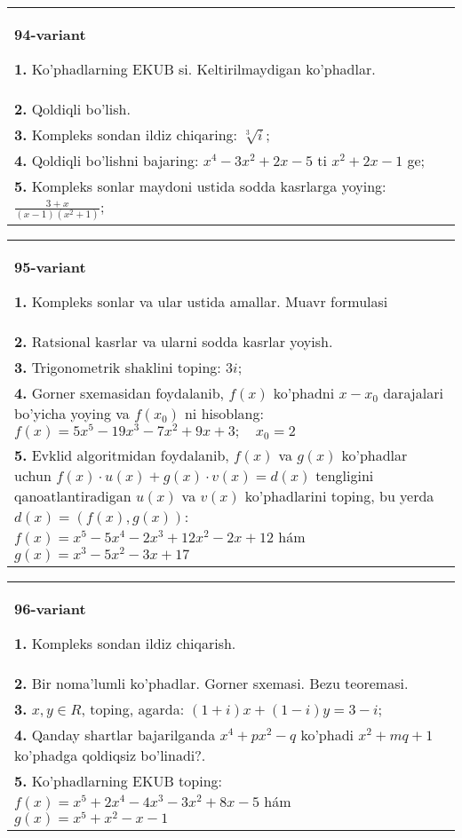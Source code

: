 \documentclass{article}
\begin{document}
\begin{tabular}{m{17cm}}
\textbf{94-variant}
\newline

\textbf{1.} Ko’phadlarning EKUB si. Keltirilmaydigan ko’phadlar. \\
\textbf{2.} Qoldiqli bo’lish.  \\
\textbf{3.} Kompleks sondan ildiz chiqaring:  $\sqrt[3]{i}$; \\
\textbf{4.} Qoldiqli bo’lishni bajaring: $x^4-3 x^2+2 x-5$ ti $x^2+2 x-1$ ge; \\
\textbf{5.} Kompleks sonlar maydoni ustida sodda kasrlarga yoying:$\frac{3+x}{(x-1)\left(x^2+1\right)}$; \\

\end{tabular}
\vspace{1cm}


\begin{tabular}{m{17cm}}
\textbf{95-variant}
\newline

\textbf{1.} Kompleks sonlar va ular ustida amallar. Muavr formulasi  \\
\textbf{2.} Ratsional kasrlar va ularni sodda kasrlar yoyish. \\
\textbf{3.} Trigonometrik shaklini toping: $3 i$; \\
\textbf{4.} Gorner sxemasidan foydalanib, $f(x)$ ko’phadni $x-x_0$ darajalari bo’yicha yoying va $f\left(x_0\right)$ ni hisoblang: $f(x)=5 x^5-19 x^3-7 x^2+9 x+3 ; \quad x_0=2$ \\
\textbf{5.} Evklid algoritmidan foydalanib, $f(x)$ va $g(x)$ ko’phadlar uchun $f(x) \cdot u(x)+g(x) \cdot v(x)=d(x)$ tengligini qanoatlantiradigan $u(x)$ va $v(x)$ ko’phadlarini toping, bu yerda $d(x)=(f(x), g(x))$:  $f(x)=x^5-5 x^4-2 x^3+12 x^2-2 x+12$ hám $g(x)=x^3-5 x^2-3 x+17$ \\

\end{tabular}
\vspace{1cm}


\begin{tabular}{m{17cm}}
\textbf{96-variant}
\newline

\textbf{1.} Kompleks sondan ildiz chiqarish. \\
\textbf{2.} Bir noma’lumli ko’phadlar. Gorner sxemasi. Bezu teoremasi.  \\
\textbf{3.}  $x, y \in R$, toping, agarda:  $(1+i) x+(1-i) y=3-i$; \\
\textbf{4.} Qanday shartlar bajarilganda $x^4+p x^2-q$ ko’phadi $x^2+m q+1$ ko’phadga qoldiqsiz bo’linadi?. \\
\textbf{5.} Ko’phadlarning EKUB toping:  $f(x)=x^5+2 x^4-4 x^3-3 x^2+8 x-5$ hám $g(x)=x^5+x^2-x-1$ \\

\end{tabular}
\vspace{1cm}
\end{document}
